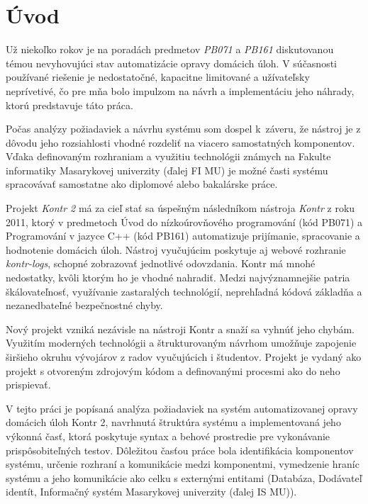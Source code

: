 \documentclass[
  digital, %
  twoside, %
  table,   %
  lof,     %
  lot,     %
]{fithesis3}
\begin{document}
\chapter*{Úvod}


Už niekoľko rokov je na poradách predmetov \textit{PB071} a \textit{PB161} diskutovanou témou nevyhovujúci stav automatizácie opravy domácich úloh. V súčasnosti používané riešenie je nedostatočné, kapacitne limitované a užívateľsky neprívetivé, čo pre mňa bolo impulzom na návrh a implementáciu jeho náhrady, ktorú predstavuje táto práca. %

Počas analýzy požiadaviek a návrhu systému som dospel k~záveru, že nástroj je z dôvodu jeho rozsiahlosti vhodné rozdeliť na viacero samostatných komponentov. Vďaka definovaným rozhraniam a využitiu technológii známych na Fakulte informatiky Masarykovej univerzity (ďalej FI MU) je možné časti systému spracovávať samostatne ako diplomové alebo bakalárske práce.

Projekt \textit{Kontr 2} má za cieľ stať sa úspešným následníkom nástroja \textit{Kontr} z roku 2011, ktorý v predmetoch Úvod do nízkoúrovňového programování (kód PB071) a Programování v jazyce C++ (kód PB161) automatizuje prijímanie, spracovanie a hodnotenie domácich úloh. Nástroj vyučujúcim poskytuje aj webové rozhranie \textit{kontr-logs}, schopné zobrazovať jednotlivé odovzdania. Kontr má mnohé nedostatky, kvôli ktorým ho je vhodné nahradiť. Medzi najvýznamnejšie patria škálovateľnosť, využívanie zastaralých technológií, neprehľadná kódová základňa a nezanedbateľné bezpečnostné chyby.

Nový projekt vzniká nezávisle na nástroji Kontr a snaží sa vyhnúť jeho chybám. Využitím moderných technológii a štrukturovaným návrhom umožňuje zapojenie širšieho okruhu vývojárov z radov vyučujúcich i študentov. Projekt je vydaný ako projekt s otvoreným zdrojovým kódom a definovanými procesmi ako do neho prispievať.

V tejto práci je popísaná analýza požiadaviek na systém automatizovanej opravy domácich úloh Kontr 2, navrhnutá štruktúra systému a implementovaná jeho výkonná časť, ktorá poskytuje syntax a behové prostredie pre vykonávanie prispôsobiteľných testov. Dôležitou časťou práce bola identifikácia komponentov systému, určenie rozhraní a komunikácie medzi komponentmi, vymedzenie hraníc systému a jeho komunikácie ako celku s externými entitami (Databáza, Dodávateľ identít, Informačný systém Masarykovej univerzity (ďalej IS MU)).
\end{document}
